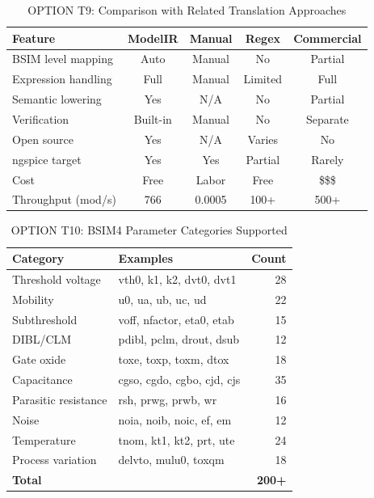 \documentclass[conference]{IEEEtran}
\begin{document}
\begin{table}[!t]
\caption{OPTION T9: Comparison with Related Translation Approaches}
\label{tab:comparison_tools}
\centering
\renewcommand{\arraystretch}{1.2}
\begin{tabular}{@{}lcccc@{}}
\toprule
\textbf{Feature} & \textbf{ModelIR} & \textbf{Manual} & \textbf{Regex} & \textbf{Commercial} \\
\midrule
BSIM level mapping & Auto & Manual & No & Partial \\
Expression handling & Full & Manual & Limited & Full \\
Semantic lowering & Yes & N/A & No & Partial \\
Verification & Built-in & Manual & No & Separate \\
Open source & Yes & N/A & Varies & No \\
ngspice target & Yes & Yes & Partial & Rarely \\
Cost & Free & Labor & Free & \$\$\$ \\
Throughput (mod/s) & 766 & 0.0005 & 100+ & 500+ \\
\bottomrule
\end{tabular}
\end{table}

\begin{table}[!t]
\caption{OPTION T10: BSIM4 Parameter Categories Supported}
\label{tab:bsim4_params}
\centering
\renewcommand{\arraystretch}{1.2}
\begin{tabular}{@{}llr@{}}
\toprule
\textbf{Category} & \textbf{Examples} & \textbf{Count} \\
\midrule
Threshold voltage & vth0, k1, k2, dvt0, dvt1 & 28 \\
Mobility & u0, ua, ub, uc, ud & 22 \\
Subthreshold & voff, nfactor, eta0, etab & 15 \\
DIBL/CLM & pdibl, pclm, drout, dsub & 12 \\
Gate oxide & toxe, toxp, toxm, dtox & 18 \\
Capacitance & cgso, cgdo, cgbo, cjd, cjs & 35 \\
Parasitic resistance & rsh, prwg, prwb, wr & 16 \\
Noise & noia, noib, noic, ef, em & 12 \\
Temperature & tnom, kt1, kt2, prt, ute & 24 \\
Process variation & delvto, mulu0, toxqm & 18 \\
\midrule
\textbf{Total} & & \textbf{200+} \\
\bottomrule
\end{tabular}
\end{table}
\end{document}
